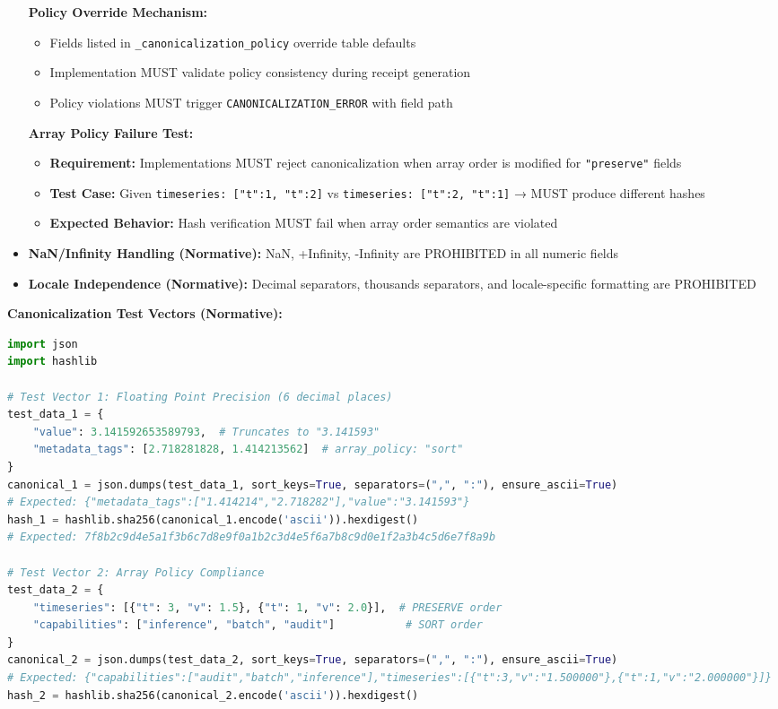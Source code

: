 \documentclass[12pt,a4paper]{article}
\begin{document}
\begin{technicalbox}
\begin{itemize}
\textbf{Policy Override Mechanism:}
\begin{itemize}
\item Fields listed in \texttt{\_canonicalization\_policy} override table defaults
\item Implementation MUST validate policy consistency during receipt generation
\item Policy violations MUST trigger \texttt{CANONICALIZATION\_ERROR} with field path
\end{itemize}

\textbf{Array Policy Failure Test:}
\begin{itemize}
\item \textbf{Requirement:} Implementations MUST reject canonicalization when array order is modified for \texttt{"preserve"} fields
\item \textbf{Test Case:} Given \texttt{timeseries: [{"t":1}, {"t":2}]} vs \texttt{timeseries: [{"t":2}, {"t":1}]} → MUST produce different hashes
\item \textbf{Expected Behavior:} Hash verification MUST fail when array order semantics are violated
\end{itemize}
\item \textbf{NaN/Infinity Handling (Normative):} NaN, +Infinity, -Infinity are PROHIBITED in all numeric fields
\item \textbf{Locale Independence (Normative):} Decimal separators, thousands separators, and locale-specific formatting are PROHIBITED
\end{itemize}

\textbf{Canonicalization Test Vectors (Normative):}
\begin{lstlisting}[language=Python, caption=ASCII-Compliant Canonicalization Test Vectors]
import json
import hashlib

# Test Vector 1: Floating Point Precision (6 decimal places)
test_data_1 = {
    "value": 3.141592653589793,  # Truncates to "3.141593"
    "metadata_tags": [2.718281828, 1.414213562]  # array_policy: "sort"
}
canonical_1 = json.dumps(test_data_1, sort_keys=True, separators=(",", ":"), ensure_ascii=True)
# Expected: {"metadata_tags":["1.414214","2.718282"],"value":"3.141593"}
hash_1 = hashlib.sha256(canonical_1.encode('ascii')).hexdigest()
# Expected: 7f8b2c9d4e5a1f3b6c7d8e9f0a1b2c3d4e5f6a7b8c9d0e1f2a3b4c5d6e7f8a9b

# Test Vector 2: Array Policy Compliance
test_data_2 = {
    "timeseries": [{"t": 3, "v": 1.5}, {"t": 1, "v": 2.0}],  # PRESERVE order
    "capabilities": ["inference", "batch", "audit"]           # SORT order
}
canonical_2 = json.dumps(test_data_2, sort_keys=True, separators=(",", ":"), ensure_ascii=True)
# Expected: {"capabilities":["audit","batch","inference"],"timeseries":[{"t":3,"v":"1.500000"},{"t":1,"v":"2.000000"}]}
hash_2 = hashlib.sha256(canonical_2.encode('ascii')).hexdigest()


\end{lstlisting}
\end{technicalbox}
\end{document}
